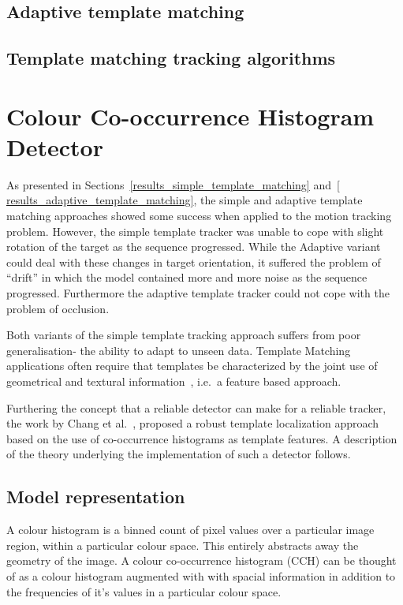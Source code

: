 \subsection{Adaptive template matching}\label{theoretical_framework_adaptive_tm}

\subsection{Template matching tracking algorithms}\label{theoretical_framework_tm_algorithms}

\section{Colour Co-occurrence Histogram Detector}\label{theoretical_framework_ch}
As presented in Sections~\ref{results_simple_template_matching} and~\ref{
results_adaptive_template_matching}, the simple and adaptive template matching
approaches showed some success when applied to the motion
tracking problem. However, the simple template tracker was unable to cope with
slight rotation of the target as the sequence progressed.
While the Adaptive variant could deal with these changes in target
orientation, it suffered the problem of ``drift'' in which the model contained
more and more noise as the sequence progressed.
Furthermore the adaptive template tracker could not cope with the problem of
occlusion.

Both variants of the simple template tracking approach suffers from poor generalisation- the
ability to adapt to unseen data. Template Matching applications often require
that templates be characterized by the joint use of geometrical and textural
information~\cite{Brunelli}, i.e.\ a feature based approach.

Furthering the concept that a reliable detector can make for a reliable tracker,
the work by Chang et al.~\cite{Chang1999}, proposed a robust template
localization approach based on the use of co-occurrence histograms as template
features. A description of the theory underlying the implementation of such a
detector follows.

\subsection{Model representation}
A colour histogram is a binned count of pixel values over a particular image
region, within a particular colour space. This entirely abstracts away the geometry of
the image.
A colour co-occurrence histogram (CCH) can be thought of as a colour histogram
augmented with with spacial information in addition to the frequencies of it's
values in a particular colour
space.

